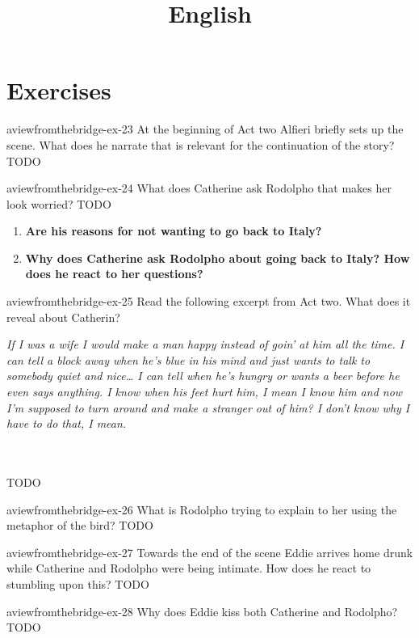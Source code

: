 \documentclass[preview]{standalone}
\begin{document}
\title{English}
\genpage

\section{Exercises}

\begin{snippetexercise}{aviewfromthebridge-ex-23}
    {At the beginning of Act two Alfieri briefly sets up the scene. What does he narrate that is relevant
    for the continuation of the story?}
    TODO
\end{snippetexercise}

\begin{snippetexercise}{aviewfromthebridge-ex-24}
    {What does Catherine ask Rodolpho that makes her look worried?}
    TODO

    \begin{enumerate}
        \item \textbf{Are his reasons for not wanting to go back to Italy?}
        \item \textbf{Why does Catherine ask Rodolpho about going back to Italy? How does he react to her
        questions?}
    \end{enumerate}
\end{snippetexercise}

\begin{snippetexercise}{aviewfromthebridge-ex-25}
    {Read the following excerpt from Act two. What does it reveal about Catherin?}
    \hspace{0.1\textwidth}
    \begin{minipage}[r]{0.8\textwidth}
        \itshape
        If I was a wife I would make a man happy instead of goin' at him all the time. I can tell a
        block away when he's blue in his mind and just wants to talk to somebody quiet and
        nice… I can tell when he's hungry or wants a beer before he even says anything. I know
        when his feet hurt him, I mean I know him and now I'm supposed to turn around and
        make a stranger out of him? I don't know why I have to do that, I mean.
    \end{minipage}
    \\\\
    TODO
\end{snippetexercise}

\begin{snippetexercise}{aviewfromthebridge-ex-26}
    {What is Rodolpho trying to explain to her using the metaphor of the bird?}
    TODO
\end{snippetexercise}

\begin{snippetexercise}{aviewfromthebridge-ex-27}
    {Towards the end of the scene Eddie arrives home drunk while Catherine and Rodolpho were being
    intimate. How does he react to stumbling upon this?}
    TODO
\end{snippetexercise}

\begin{snippetexercise}{aviewfromthebridge-ex-28}
    {Why does Eddie kiss both Catherine and Rodolpho?}
    TODO
\end{snippetexercise}
\end{document}
